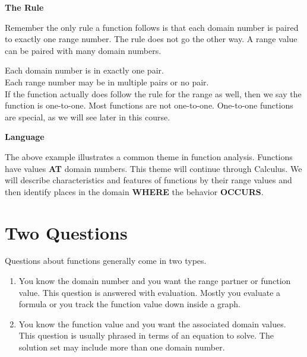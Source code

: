 \documentclass{ximera}
\begin{document}
\begin{remark}  \textbf{\textcolor{blue!75!black}{The Rule}} 

Remember the only rule a function follows is that each domain number is paired to exactly one range number.  The rule does not go the other way.  A range value can be paired with many domain numbers.

Each domain number is in exactly one pair. \\
Each range number may be in multiple pairs or no pair. \\


If the function actually does follow the rule for the range as well, then we say the function is one-to-one. Most functions are not one-to-one.  One-to-one functions are special, as we will see later in this course.


\end{remark}




\begin{remark}  \textbf{\textcolor{blue!75!black}{Language}} 

The above example illustrates a common theme in function analysis.  Functions have values \textbf{\textcolor{purple!85!blue}{AT}} domain numbers.  This theme will continue through Calculus.  We will describe characteristics and features of functions by their range values and then identify places in the domain \textbf{\textcolor{purple!85!blue}{WHERE}} the behavior \textbf{\textcolor{purple!85!blue}{OCCURS}}. 


\end{remark}





\section{Two Questions}

Questions about functions generally come in two types.
\begin{enumerate}
\item You know the domain number and you want the range partner or function value.  This question is answered with evaluation. Mostly you evaluate a formula or you track the function value down inside a graph.

\item You know the function value and you want the associated domain values.  This question is usually phrased in terms of an equation to solve.  The solution set may include more than one domain number.
\end{enumerate}
\end{document}
